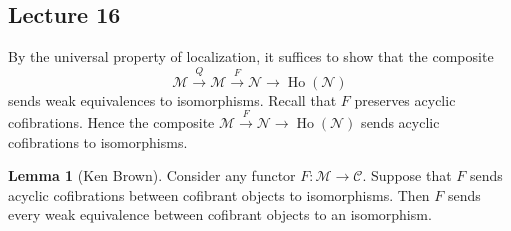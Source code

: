 \documentclass[10pt,letterpaper,cm]{nupset}
\theoremstyle{definition}
\theoremstyle{theorem}
\newtheorem{lemma}[defn]{Lemma}
\theoremstyle{remark}
\newcommand{\1}{\mathbb{1}}
\renewcommand{\c}{\mathcal{C}}
\newcommand{\n}{\mathcal{N}}
\newcommand{\m}{\mathcal{M}}
\newcommand{\0}{\vec 0}
\DeclareMathOperator{\ho}{Ho}
\begin{document}
\subsection{Lecture 16}

By the universal property of localization, it suffices to show that the composite 
\[
\m \xrightarrow{Q} \m \xrightarrow{F} \n \to \ho(\n)
\]
sends weak equivalences to isomorphisms. Recall that $F$ preserves acyclic cofibrations. Hence the composite $\m \xrightarrow{F} \n \to \ho(\n)$ sends acyclic cofibrations to isomorphisms. 

\begin{lemma}[Ken Brown] \label{KB}
Consider any functor $F : \m \to \c$. Suppose that $F$ sends acyclic cofibrations between cofibrant objects to isomorphisms. Then $F$ sends every weak equivalence between cofibrant objects to an isomorphism. 
\end{lemma}
\end{document}
